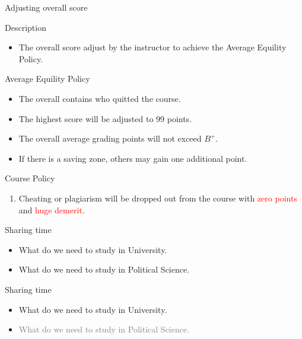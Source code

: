 \documentclass{beamer}
\begin{document}
\begin{frame}{Adjusting overall score}
\begin{block}{Description}
\begin{itemize}
\item The overall score adjust by the instructor to achieve the Average Equility Policy.
\end{itemize}
\end{block}
\begin{block}{Average Equility Policy}
\begin{itemize}
\item The overall contains who quitted the course.
\item The highest score will be adjusted to 99 points.
\item The overall average grading points will not exceed $B^{+}$.
\item If there is a saving zone, others may gain one additional point.
\end{itemize}
\end{block}
\end{frame}
\begin{frame}{Course Policy}
\begin{enumerate}
\item Cheating or plagiarism will be dropped out from the course with \textcolor{red}{zero points} and \textcolor{red}{huge demerit}. \\
\end{enumerate}
\end{frame}
\begin{frame}{Sharing time}
\begin{itemize}
\item What do we need to study in University.
\item What do we need to study in Political Science.
\end{itemize}
\end{frame}
\begin{frame}{Sharing time}
\begin{itemize}
\item What do we need to study in University.
\item \textcolor{gray}{What do we need to study in Political Science.}
\end{itemize}
\end{frame}
\end{document}
